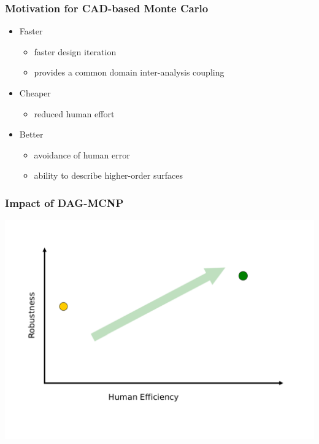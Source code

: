 \documentclass[14pt]{beamer}
\begin{document}
\begin{frame}
\frametitle{Motivation for CAD-based Monte Carlo}
\begin{itemize}
\vfill
\item Faster
	\begin{itemize}
	\item faster design iteration
	\item provides a common domain inter-analysis coupling
	\end{itemize}
\vfill
\item Cheaper
	\begin{itemize}
	\item reduced human effort
	\end{itemize}
\vfill
\item Better
	\begin{itemize}
	\item avoidance of human error
	\item ability to describe higher-order surfaces
	\end{itemize}
\end{itemize}

\end{frame}

\begin{frame}
\frametitle{Impact of DAG-MCNP}
\vfill
\includegraphics[scale=0.43, trim = 0 0 28 0]{QualityGraph.png}
\end{frame}
\end{document}
